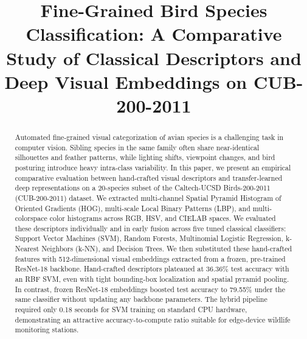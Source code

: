 \documentclass[conference]{IEEEtran}
\begin{document}
\title{Fine-Grained Bird Species Classification: A Comparative Study of
Classical Descriptors and Deep Visual Embeddings on CUB-200-2011}

\author{%
}

\maketitle

\begin{abstract}
Automated fine-grained visual categorization of avian species is a challenging task in computer vision. Sibling species in the same family often share near-identical silhouettes and feather patterns, while lighting shifts, viewpoint changes, and bird posturing introduce heavy intra-class variability. In this paper, we present an empirical comparative evaluation between hand-crafted visual descriptors and transfer-learned deep representations on a 20-species subset of the Caltech-UCSD Birds-200-2011 (CUB-200-2011) dataset. We extracted multi-channel Spatial Pyramid Histogram of Oriented Gradients (HOG), multi-scale Local Binary Patterns (LBP), and multi-colorspace color histograms across RGB, HSV, and CIELAB spaces. We evaluated these descriptors individually and in early fusion across five tuned classical classifiers: Support Vector Machines (SVM), Random Forests, Multinomial Logistic Regression, k-Nearest Neighbors (k-NN), and Decision Trees. We then substituted these hand-crafted features with 512-dimensional visual embeddings extracted from a frozen, pre-trained ResNet-18 backbone. Hand-crafted descriptors plateaued at 36.36\% test accuracy with an RBF SVM, even with tight bounding-box localization and spatial pyramid pooling. In contrast, frozen ResNet-18 embeddings boosted test accuracy to 79.55\% under the same classifier without updating any backbone parameters. The hybrid pipeline required only 0.18 seconds for SVM training on standard CPU hardware, demonstrating an attractive accuracy-to-compute ratio suitable for edge-device wildlife monitoring stations.
\end{abstract}
\end{document}
